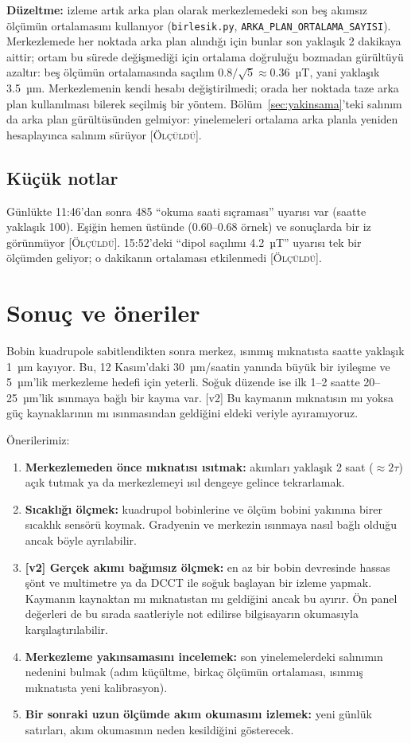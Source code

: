 \documentclass[11pt,a4paper]{article}
\newcommand{\kod}[1]{\texttt{#1}}
\newcommand{\olc}{\textsc{[Ölçüldü]}}
\begin{document}
\textbf{Düzeltme:} izleme artık arka plan olarak merkezlemedeki son beş akımsız ölçümün ortalamasını
kullanıyor (\kod{birlesik.py}, \kod{ARKA\_PLAN\_ORTALAMA\_SAYISI}). Merkezlemede her noktada arka plan
alındığı için bunlar son yaklaşık 2 dakikaya aittir; ortam bu sürede değişmediği için ortalama doğruluğu
bozmadan gürültüyü azaltır: beş ölçümün ortalamasında saçılım $0.8/\sqrt{5} \approx 0.36$~µT, yani
yaklaşık 3.5~µm. Merkezlemenin kendi hesabı değiştirilmedi; orada her noktada taze arka plan kullanılması
bilerek seçilmiş bir yöntem. Bölüm~\ref{sec:yakinsama}'teki salınım da arka plan gürültüsünden gelmiyor: yinelemeleri
ortalama arka planla yeniden hesaplayınca salınım sürüyor \olc.

\subsection{Küçük notlar}
Günlükte 11:46'dan sonra 485 ``okuma saati sıçraması'' uyarısı var (saatte yaklaşık 100). Eşiğin hemen
üstünde (0.60--0.68 örnek) ve sonuçlarda bir iz görünmüyor \olc. 15:52'deki ``dipol saçılımı 4.2~µT'' uyarısı
tek bir ölçümden geliyor; o dakikanın ortalaması etkilenmedi \olc.

\section{Sonuç ve öneriler}

Bobin kuadrupole sabitlendikten sonra merkez, ısınmış mıknatısta saatte yaklaşık 1~µm kayıyor. Bu, 12
Kasım'daki 30~µm/saatin yanında büyük bir iyileşme ve 5~µm'lik merkezleme hedefi için yeterli. Soğuk
düzende ise ilk 1--2 saatte 20--25~µm'lik ısınmaya bağlı bir kayma var. [v2] Bu kaymanın mıknatısın mı
yoksa güç kaynaklarının mı ısınmasından geldiğini eldeki veriyle ayıramıyoruz.

Önerilerimiz:
\begin{enumerate}
\item \textbf{Merkezlemeden önce mıknatısı ısıtmak:} akımları yaklaşık 2 saat ($\approx 2\tau$) açık
tutmak ya da merkezlemeyi ısıl dengeye gelince tekrarlamak.
\item \textbf{Sıcaklığı ölçmek:} kuadrupol bobinlerine ve ölçüm bobini yakınına birer sıcaklık sensörü
koymak. Gradyenin ve merkezin ısınmaya nasıl bağlı olduğu ancak böyle ayrılabilir.
\item \textbf{[v2] Gerçek akımı bağımsız ölçmek:} en az bir bobin devresinde hassas şönt ve multimetre ya da
DCCT ile soğuk başlayan bir izleme yapmak. Kaymanın kaynaktan mı mıknatıstan mı geldiğini ancak bu ayırır.
Ön panel değerleri de bu sırada saatleriyle not edilirse bilgisayarın okumasıyla karşılaştırılabilir.
\item \textbf{Merkezleme yakınsamasını incelemek:} son yinelemelerdeki salınımın nedenini bulmak
(adım küçültme, birkaç ölçümün ortalaması, ısınmış mıknatısta yeni kalibrasyon).
\item \textbf{Bir sonraki uzun ölçümde akım okumasını izlemek:} yeni günlük satırları, akım okumasının neden
kesildiğini gösterecek.
\end{enumerate}
\end{document}
